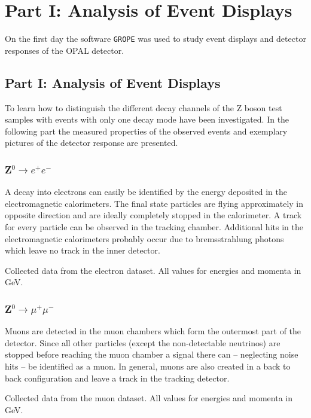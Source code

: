 \documentclass[11pt, a4paper]{article}
\numberwithin{equation}{section}
\begin{document}
\section{Part I: Analysis of Event Displays}

On the first day the software \texttt{GROPE} was used to study event displays and detector responses of the OPAL detector.

\subsection{Part I: Analysis of Event Displays}

To learn how to distinguish the different decay channels of the Z boson test samples with events with only one decay mode have been investigated.
In the following part the measured properties of the observed events and exemplary pictures of the detector response are presented.

\subsubsection{Z$^0\rightarrow e^+e^-$}

A decay into electrons can easily be identified by the energy deposited in the electromagnetic calorimeters.
The final state particles are flying approximately in opposite direction and are ideally completely stopped in the calorimeter.
A track for every particle can be observed in the tracking chamber.
Additional hits in the electromagnetic calorimeters probably occur due to bremsstrahlung photons which leave no track in the inner detector.
\begin{table}
	\centering

	
	\caption{Collected data from the electron dataset. All values for energies and momenta in \si{GeV}.}
\end{table}

\subsubsection{Z$^0\rightarrow \mu^+\mu^-$}

Muons are detected in the muon chambers which form the outermost part of the detector.
Since all other particles (except the non-detectable neutrinos) are stopped before reaching the muon chamber a signal there can -- neglecting noise hits -- be identified as a muon. 
In general, muons are also created in a back to back configuration and leave a track in the tracking detector.
\begin{table}[h]
	\centering
	\resizebox{\textwidth}{!}{
		
	}
	\caption{Collected data from the muon dataset. All values for energies and momenta in \si{GeV}.}
\end{table}
\end{document}
